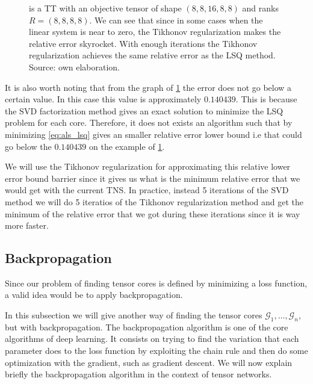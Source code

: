 \documentclass[11pt,a4paper,openright,oneside]{book}
\numberwithin{equation}{section}
\newcommand{\figref}[1]{\cref{#1}}
\begin{document}
{\begin{figure}[H]
{    is a TT with an objective tensor of shape $(8,8,16,8,8)$ and ranks $R = (8,8,8,8)$.
    We can see that
    since in some cases when the linear system is near to zero, the Tikhonov regularization makes the relative
    error skyrocket. With enough iterations the Tikhonov regularization achieves the same
    relative error as the LSQ method.
    Source: own elaboration.}
    \label{fig:als-convergence-tiknov}
\end{figure}
It is also worth noting that from the graph of \figref{fig:als-convergence-tiknov} the error does not go below
a certain value. In this case this value is approximately $0.140439$. This is because the \gls{SVD} factorization
method gives an exact solution to minimize the \gls{LSQ} problem for each core. Therefore, it does not exists
an algorithm such that by minimizing \ref{eq:als_lsq} gives an smaller relative error lower bound i.e that could
go below the $0.140439$ on the example of \figref{fig:als-convergence-tiknov}.

We will use the Tikhonov regularization for approximating this relative lower error bound barrier since it gives us what
is the minimum relative error that we would get with the current \gls{TNS}. In practice, instead 5 iterations of the \gls{SVD} method
we will do 5 iteratios of the Tikhonov regularization method and get the minimum of the relative error that we got during these iterations
since it is way more faster.


\subsection{Backpropagation} \label{backpropagation}

Since our problem of finding tensor cores is defined by minimizing a loss function, a valid idea would be
to apply backpropagation.

In this subsection we will give another way of finding the tensor cores $\mathcal{G}_1, \dots, \mathcal{G}_n$, but with 
backpropagation. The backpropagation algorithm is one of the core algorithms of deep learning. It consists on
trying to find the variation that each parameter does to the loss function by exploiting the chain rule and
then do some optimization with the gradient, such as gradient descent. We will now explain briefly the backpropagation
algorithm in the context of tensor networks.


}
\end{document}
